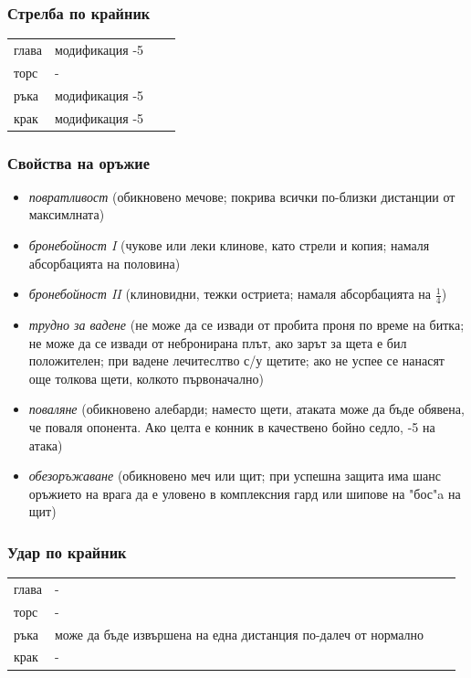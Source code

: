 \subsubsection{Стрелба по крайник}
\begin{tabular}{l | l | l | l }
глава & модификация -5  \\
торс  & -  \\
ръка & модификация -5  \\
крак & модификация -5  \\
\end{tabular}


\subsubsection{Свойства на оръжие}
\begin{itemize}
\item{\textit{повратливост} (обикновено мечове; покрива всички по-близки дистанции от максимлната)}
\item{\textit{бронебойност I} (чукове или леки клинове, като стрели и копия; намаля абсорбацията на половина)}
\item{\textit{бронебойност II} (клиновидни, тежки остриета; намаля абсорбацията на $\frac1 4$)}
\item{\textit{трудно за вадене} (не може да се извади от пробита проня по време на битка; не може да се извади от небронирана плът, ако зарът за щета е бил положителен; при вадене лечитеслтво с/у щетите; ако не успее се  нанасят още толкова щети, колкото първоначално)}
\item{\textit{поваляне} (обикновено алебарди; наместо щети, атаката може да бъде обявена, че поваля опонента. Ако целта е конник в качествено бойно седло, -5 на атака)}
\item{\textit{обезоръжаване} (обикновено меч или щит; при успешна защита има шанс оръжието на врага да е уловено в комплексния гард или шипове на "бос"a на щит)}
\end{itemize}


\subsubsection{Удар по крайник}
\begin{tabular}{l | l | l | l }
глава & -  \\
торс  & -  \\
ръка  & може да бъде извършена на една дистанция по-далеч от нормално  \\
крак  & -  \\
\end{tabular}


